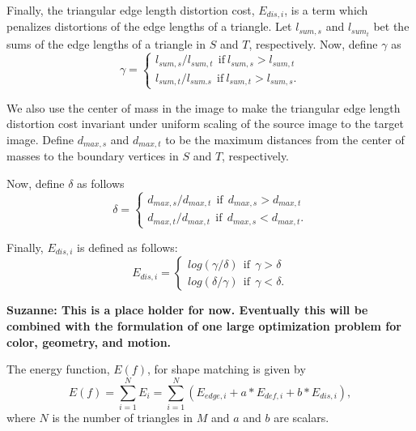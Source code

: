 Finally, the triangular edge length distortion cost, $E_{dis,i}$, is a 
term which penalizes distortions of the edge lengths of a triangle.  Let
$l_{sum,s}$ and $l_{sum_t}$ bet the sums of the edge lengths of a triangle 
in $S$ and $T$, respectively.  Now, define $\gamma$ as 
$$
\gamma =\left\{\begin{matrix}
l_{sum, s}/l_{sum, t} \  \ \mathrm{if} \   l_{sum, s} >   l_{sum, t} \\
l_{sum, t}/l_{sum. s} \  \ \mathrm{if} \   l_{sum, t} >  l_{sum, s}.
\end{matrix}\right.
$$

We also use the center of mass in the image to make the triangular edge 
length distortion cost invariant under uniform scaling of the source image 
to the target image.  Define $d_{max, s}$ and $d_{max, t}$ to be the 
maximum distances from the center of masses to the boundary vertices in 
$S$ and $T$, respectively.

Now, define $\delta$ as follows
$$
\delta =\left\{\begin{matrix}
d_{max,s} / d_{max,t} \ \ \mathrm{if} \ \ d_{max,s} > d_{max,t}\\
d_{max,t} / d_{max,t} \ \ \mathrm{if} \ \ d_{max,s} < d_{max,t}.
\end{matrix}\right.
$$

Finally, $E_{dis, i}$ is defined as follows:
$$
E_{dis,i}=\left\{\begin{matrix}
log(\gamma / \delta ) \ \ \mathrm{if} \ \ \gamma > \delta \\
log(\delta / \gamma ) \ \ \mathrm{if} \ \ \gamma < \delta.
\end{matrix}\right.
$$

{\bf{Suzanne:  This is a place holder for now.  Eventually this will be 
combined with the formulation of one large optimization problem for 
color, geometry, and motion.}}

The energy function, $E(f)$, for shape matching is given by
\begin{equation}
E(f)=\sum_{i=1}^{N}E_{i}=\sum_{i=1}^{N}(E_{edge,i}+a*E_{def,i}+b*E_{dis,i}),
\end{equation} 
where $N$ is the number of triangles in $M$ and $a$ and $b$ are scalars. 
